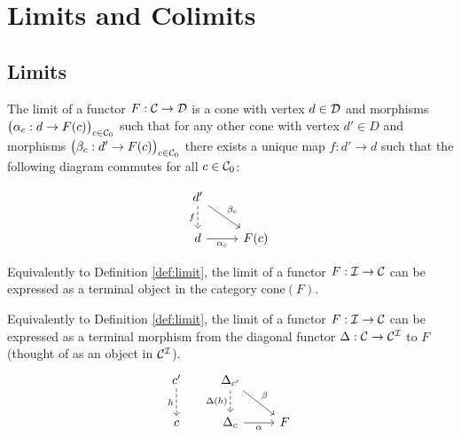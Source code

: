 \section{Limits and Colimits}

\subsection{Limits}

\begin{definition}
	The limit of a functor $F:\mathcal{C}\to \mathcal{D}$ is a cone with vertex $d\in \mathcal{D}$ and
	morphisms $\big(\alpha_c: d \to F(c)\big)_{c\in \mathcal{C}_0}$ such that for any other
	cone with vertex $d'\in D$ and morphisms $\big(\beta_c: d' \to F(c)\big)_{c\in
	\mathcal{C}_0}$ there exists a unique map $f:d'\to d$ such that the following diagram
	commutes for all $c\in \mathcal{C}_0$: \parencite{leinster:basic_category_theory}

	\[\begin{tikzcd}
		{d'} \\
		d & {F(c)}
		\arrow["{\alpha_c}"', from=2-1, to=2-2]
		\arrow["{\beta_c}", from=1-1, to=2-2]
		\arrow["f"', dashed, from=1-1, to=2-1]
	\end{tikzcd}\]
\end{definition}

\begin{definition}
	Equivalently to Definition \ref{def:limit}, the limit of a functor $F:\mathcal{I}\to
	\mathcal{C}$ can be expressed as a terminal object in the category $\mathrm{cone}(F)$.
\end{definition}

\begin{definition}
	Equivalently to Definition \ref{def:limit}, the limit of a functor $F:\mathcal{I}\to
	\mathcal{C}$ can be expressed as a terminal morphism from the diagonal functor $\Delta:
	\mathcal{C} \to \mathcal{C}^{\mathcal{I}}$ to $F$ (thought of as an object in $\mathcal{C}^{\mathcal{I}}$).
	\[\begin{tikzcd}[ampersand replacement=\&]
		{c'} \& {\Delta_{c'}} \\
		c \& {\Delta_c} \& F
		\arrow["h"', dashed, from=1-1, to=2-1]
		\arrow["{\Delta(h)}"', dashed, from=1-2, to=2-2]
		\arrow["\beta", from=1-2, to=2-3]
		\arrow["\alpha"', from=2-2, to=2-3]
	\end{tikzcd}\]
\end{definition}

